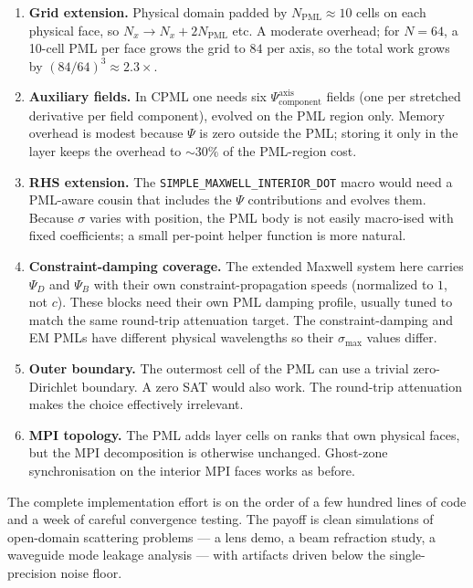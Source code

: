 \documentclass[11pt]{article}
\begin{document}
\begin{enumerate}
  \item \textbf{Grid extension.} Physical domain padded by
        $N_{\text{PML}} \approx 10$ cells on each physical face, so
        $N_x \to N_x + 2 N_{\text{PML}}$ etc. A moderate overhead;
        for $N = 64$, a 10-cell PML per face grows the grid to $84$
        per axis, so the total work grows by
        $(84/64)^3 \approx 2.3\times$.
  \item \textbf{Auxiliary fields.} In CPML one needs six
        $\Psi^{\text{axis}}_{\text{component}}$ fields (one per
        stretched derivative per field component), evolved on the
        PML region only. Memory overhead is modest because $\Psi$ is
        zero outside the PML; storing it only in the layer keeps
        the overhead to $\sim 30\%$ of the PML-region cost.
  \item \textbf{RHS extension.} The \texttt{SIMPLE\_MAXWELL\_INTERIOR\_DOT}
        macro would need a PML-aware cousin that includes the $\Psi$
        contributions and evolves them. Because $\sigma$ varies with
        position, the PML body is not easily macro-ised with fixed
        coefficients; a small per-point helper function is more
        natural.
  \item \textbf{Constraint-damping coverage.} The extended Maxwell
        system here carries $\Psi_D$ and $\Psi_B$ with their own
        constraint-propagation speeds (normalized to $1$, not $c$).
        These blocks need their own PML damping profile, usually
        tuned to match the same round-trip attenuation target. The
        constraint-damping and EM PMLs have different physical
        wavelengths so their $\sigma_{\max}$ values differ.
  \item \textbf{Outer boundary.} The outermost cell of the PML can
        use a trivial zero-Dirichlet boundary. A zero SAT would also
        work. The round-trip attenuation makes the choice
        effectively irrelevant.
  \item \textbf{MPI topology.} The PML adds layer cells on ranks
        that own physical faces, but the MPI decomposition is
        otherwise unchanged. Ghost-zone synchronisation on the
        interior MPI faces works as before.
\end{enumerate}

The complete implementation effort is on the order of a few hundred
lines of code and a week of careful convergence testing. The payoff
is clean simulations of open-domain scattering problems — a lens
demo, a beam refraction study, a waveguide mode leakage analysis —
with artifacts driven below the single-precision noise floor.
\end{document}
